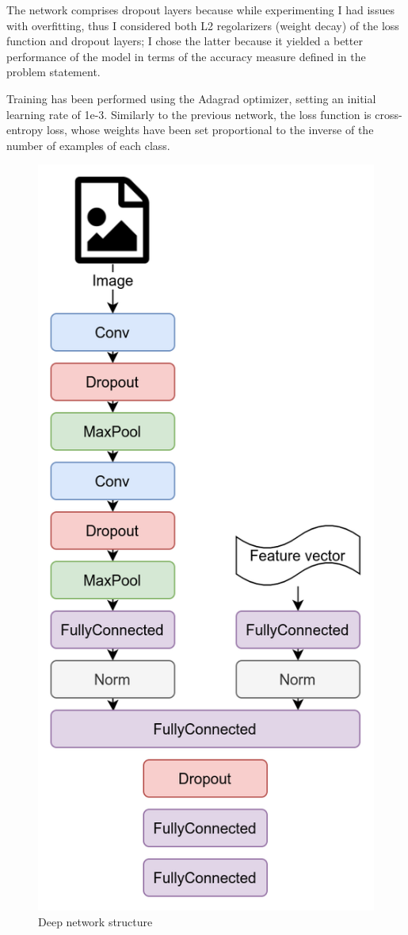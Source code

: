 \documentclass[10pt,a4paper,twocolumn]{article}
\begin{document}
The network comprises dropout layers because while experimenting I had issues with overfitting, thus I considered both L2 regolarizers (weight decay) of the loss function and dropout layers; I chose the latter because it yielded a better performance of the model in terms of the accuracy measure defined in the problem statement.

Training has been performed using the Adagrad optimizer, setting an initial learning rate of 1e-3. Similarly to the previous network, the loss function is cross-entropy loss, whose weights have been set proportional to the inverse of the number of examples of each class.

\begin{figure}[H]
    \includegraphics[width=0.7\linewidth]{Network.png}
    \caption{Deep network structure}
\end{figure}
\end{document}
